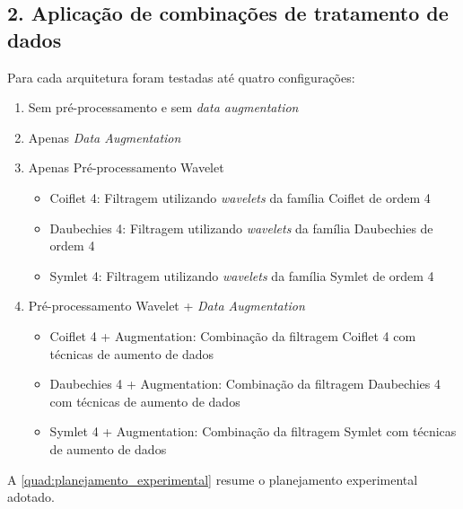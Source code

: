 \subsection*{2. Aplicação de combinações de tratamento de dados}

Para cada arquitetura foram testadas até quatro configurações:

\begin{enumerate}
    \item Sem pré-processamento e sem \textit{data augmentation}
    \item Apenas \textit{Data Augmentation}
    \item Apenas Pré-processamento Wavelet
    \begin{itemize}
        \item Coiflet 4: Filtragem utilizando \textit{wavelets} da família Coiflet de ordem 4
        \item Daubechies 4: Filtragem utilizando \textit{wavelets} da família Daubechies de ordem 4
        \item Symlet 4: Filtragem utilizando \textit{wavelets} da família Symlet de ordem 4
    \end{itemize}
    \item Pré-processamento Wavelet + \textit{Data Augmentation}
    \begin{itemize}
        \item Coiflet 4 + Augmentation: Combinação da filtragem Coiflet 4 com técnicas de aumento de dados
        \item Daubechies 4 + Augmentation: Combinação da filtragem Daubechies 4 com técnicas de aumento de dados
        \item Symlet 4 + Augmentation: Combinação da filtragem Symlet com técnicas de aumento de dados
    \end{itemize}
\end{enumerate}

A \autoref{quad:planejamento_experimental} resume o planejamento experimental adotado. 


